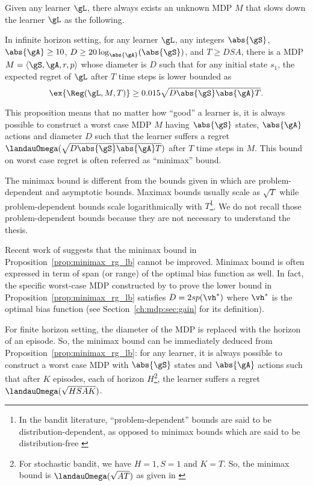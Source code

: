 Given any learner $\gL$, there always exists an unknown MDP $M$ that slows down the learner $\gL$ as the following.
\begin{prop}
    \label{prop:minimax_rg_lb}
    In infinite horizon setting, for any learner $\gL$, any integers $\abs{\gS}$, $\abs{\gA}\ge10$, $D\ge 20\log_{\abs{\gA}}(\abs{\gS})$, and $T\ge DSA$, there is a MDP $M=\langle\gS,\gA,r,p\rangle$ whose diameter is $D$ such that for any initial state $s_1$, the expected regret of $\gL$ after $T$ time steps is lower bounded as
    \begin{equation}
        \label{eq:minimax_rg_lb}
        \ex{\Reg(\gL, M, T)} \ge 0.015\sqrt{D\abs{\gS}\abs{\gA}T}.
    \end{equation}
\end{prop}
This proposition means that no matter how ``good'' a learner is, it is always possible to construct a worst case MDP $M$ having $\abs{\gS}$ states, $\abs{\gA}$ actions and diameter $D$ such that the learner suffers a regret $\landauOmega(\sqrt{D\abs{\gS}\abs{\gA}T})$ after $T$ time steps in $M$.
This bound on worst case regret is often referred as ``minimax'' bound.

The minimax bound is different from the bounds given in \cite{ok2018exploration, burnetas1997optimal} which are problem-dependent and asymptotic bounds.
Maximax bounds usually scale as $\sqrt{T}$ while problem-dependent bounds scale logarithmically with $T$\footnote{In the bandit literature, “problem-dependent” bounds are said to be distribution-dependent, as opposed to minimax bounds which are said to be distribution-free \cite{garivier2019explore}}.
We do not recall those problem-dependent bounds because they are not necessary to understand the thesis.

Recent work of \cite{zhang2019regret} suggests that the minimax bound in Proposition~\ref{prop:minimax_rg_lb} cannot be improved.
Minimax bound is often expressed in term of span (or range) of the optimal bias function as well.
In fact, the specific worst-case MDP constructed by \cite{jaksch2010near} to prove the lower bound in Proposition~\ref{prop:minimax_rg_lb} satisfies $D=2sp(\vh^*)$ where $\vh^*$ is the optimal bias function (see Section~\ref{ch:mdp:sec:gain} for its definition).

For finite horizon setting, the diameter of the MDP is replaced with the horizon of an episode.
So, the minimax bound can be immediately deduced from Proposition~\ref{prop:minimax_rg_lb}: for any learner, it is always possible to construct a worst case MDP with $\abs{\gS}$ states and $\abs{\gA}$ actions such that after $K$ episodes, each of horizon $H$\footnote{For stochastic bandit, we have $H=1, S=1$ and $K=T$. So, the minimax bound is $\landauOmega(\sqrt{AT})$ as given in \cite{bubeck2012regret}}, the learner suffers a regret $\landauOmega(\sqrt{HSAK})$.

